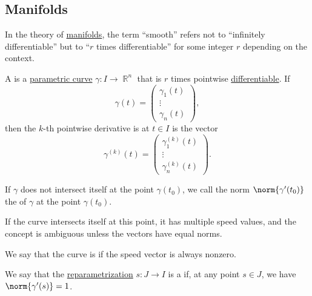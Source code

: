 \subsection{Manifolds}\label{subsec:manifolds}

\begin{remark}\label{rem:smooth_manifold}
  In the theory of \hyperref[def:topological_manifold]{manifolds}, the term \enquote{smooth} refers not to \enquote{infinitely differentiable} but to \enquote{\( r \) times differentiable} for some integer \( r \) depending on the context.
\end{remark}

\begin{definition}\label{def:smooth_curve}
  A  is a \hyperref[def:parametric_curve]{parametric curve} \( \gamma: I \to \BbbR^n \) that is \( r \) times pointwise \hyperref[def:differentiability/frechet]{differentiable}. If
  \begin{equation*}
    \gamma(t) = \begin{pmatrix}
      \gamma_1(t) \\
      \vdots \\
      \gamma_n(t)
    \end{pmatrix},
  \end{equation*}
  then the \( k \)-th pointwise derivative is at \( t \in I \) is the vector
  \begin{equation*}
    \gamma^{(k)}(t) = \begin{pmatrix}
      \gamma_1^{(k)}(t) \\
      \vdots \\
      \gamma_n^{(k)}(t)
    \end{pmatrix}.
  \end{equation*}

  \begin{thmenum}
     If \( \gamma \) does not intersect itself at the point \( \gamma(t_0) \), we call the norm \( \norm{\gamma'(t_0)} \) the  of \( \gamma \) at the point \( \gamma(t_0) \).

    If the curve intersects itself at this point, it has multiple speed values, and the concept is ambiguous unless the vectors have equal norms.

     We say that the curve is  if the speed vector is always nonzero.

     We say that the \hyperref[def:reparametrization]{reparametrization} \( s: J \to I \) is a  if, at any point \( s \in J \), we have \( \norm{\gamma'(s)} = 1 \).


\end{thmenum}
\end{definition}
